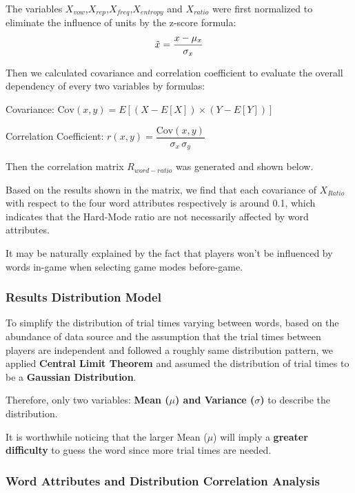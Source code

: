 The variables $X_{vow}$,$X_{rep}$,$X_{freq}$,$X_{entropy}$ and $X_{ratio}$ were first normalized to eliminate the influence of units by the z-score formula:
\begin{equation*}
    \Tilde{x}=\frac{x-\mu_{x}}{\sigma_{x}}
\end{equation*}

\par Then we calculated covariance and correlation coefficient to evaluate the overall dependency of every two variables by formulas:

\begin{center}
    Covariance: $\mathrm{Cov}(x,y)=E[(X-E[X])\times (Y-E[Y])]$
\end{center}

\begin{center}
    Correlation Coefficient: $r(x,y)=\dfrac{\mathrm{Cov}(x,y)}{\sigma_x\,\sigma_y}$
\end{center}
\par Then the correlation matrix $R_{word-ratio}$ was generated and shown below.
\par Based on the results shown in the matrix, we find that each covariance of $X_{Ratio}$ with respect to the four word attributes respectively is around 0.1, which indicates that the Hard-Mode ratio are not necessarily affected by word attributes. 

It may be naturally explained by the fact that players won't be influenced by words in-game when selecting game modes before-game.

\subsubsection{Results Distribution Model}
To simplify the distribution of trial times varying between words, based on the abundance of data source and the assumption that the trial times between players are independent and followed a roughly same distribution pattern, we applied \textbf{Central Limit Theorem} and assumed the distribution of trial times to be a \textbf{Gaussian Distribution}.

Therefore, only two variables: \textbf{Mean ($\mu$) and Variance ($\sigma$)} to describe the distribution.

It is worthwhile noticing that the larger Mean ($\mu$) will imply a \textbf{greater difficulty} to guess the word since more trial times are needed.

\subsubsection{Word Attributes and Distribution Correlation Analysis}


